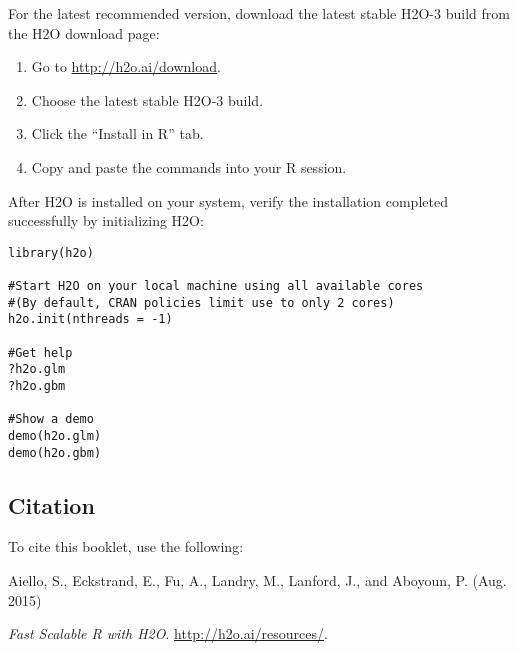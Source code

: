 {For the latest recommended version, download the
latest stable H2O-3 build from the H2O download page:

\begin{enumerate}
\item Go to {\url{http://h2o.ai/download}}.
\item Choose the latest stable H2O-3 build.
\item Click the ``Install in R'' tab.
\item Copy and paste the commands into your R session.
\end{enumerate}

\bigskip

After H2O is installed on your system, verify the installation completed successfully by initializing H2O:

\begin{lstlisting}[style=R]
library(h2o)

#Start H2O on your local machine using all available cores
#(By default, CRAN policies limit use to only 2 cores)
h2o.init(nthreads = -1)

#Get help
?h2o.glm
?h2o.gbm

#Show a demo
demo(h2o.glm)
demo(h2o.gbm)
\end{lstlisting}

\subsection{Citation}

To cite this booklet, use the following: 

Aiello, S., Eckstrand, E., Fu, A., Landry, M., Lanford, J., and Aboyoun, P. (Aug. 2015) {\textit{Fast Scalable R with H2O}. {\url{http://h2o.ai/resources/}}. 




}}
